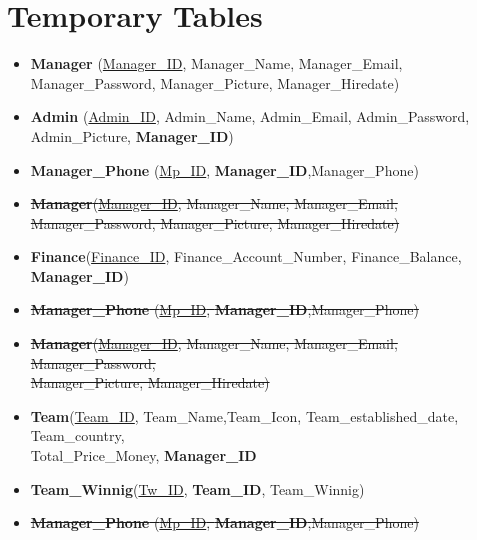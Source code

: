 \section{Temporary Tables}
\hrulefill
\begin{itemize}
    \item \textbf{Manager} (\underline{Manager\_ID}, Manager\_Name, Manager\_Email, Manager\_Password, Manager\_Picture, Manager\_Hiredate)
    \item \textbf{Admin} (\underline{Admin\_ID}, Admin\_Name, Admin\_Email, Admin\_Password, Admin\_Picture, \textbf{Manager\_ID})
    \item \textbf{Manager\_Phone} (\underline{Mp\_ID}, \textbf{Manager\_ID},{Manager\_Phone})


    \item \sout{\textbf{Manager}(\underline{Manager\_ID}, Manager\_Name, Manager\_Email, Manager\_Password, Manager\_Picture, Manager\_Hiredate)}
    \item \textbf{Finance}(\underline{Finance\_ID}, Finance\_Account\_Number, Finance\_Balance,\textbf{ Manager\_ID})
    \item \sout{\textbf{Manager\_Phone} (\underline{Mp\_ID}, \textbf{Manager\_ID},{Manager\_Phone})}


    \item \sout{\textbf{Manager}(\underline{Manager\_ID}, Manager\_Name, Manager\_Email, Manager\_Password,\\Manager\_Picture, Manager\_Hiredate)}
    \item \textbf{Team}(\underline{Team\_ID}, Team\_Name,Team\_Icon, Team\_established\_date, Team\_country,\\Total\_Price\_Money, \textbf{Manager\_ID}
    \item \textbf{Team\_Winnig}(\underline{Tw\_ID}, \textbf{Team\_ID}, Team\_Winnig)
    \item \sout{\textbf{Manager\_Phone} (\underline{Mp\_ID}, \textbf{Manager\_ID},{Manager\_Phone})}




\end{itemize}
